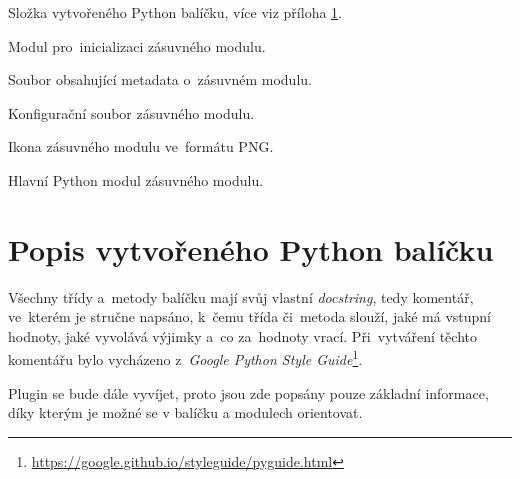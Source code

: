 \begin{description}
\begin{description}[leftmargin=1cm]
\begin{description}[leftmargin=1cm]
		\end{description}
	\end{description}
	\item[\texttt{pubin}:] Složka vytvořeného Python balíčku, více viz příloha \ref{popis_python_balicku}.
	\item[\texttt{\detokenize{__init__.py}}:] Modul pro~inicializaci zásuvného modulu.
	\item[\texttt{metadata.txt}:] Soubor obsahující metadata o~zásuvném modulu.
	\item[\texttt{puplugin.cfg}:] Konfigurační soubor zásuvného modulu.
	\item[\texttt{puplugin.png}:] Ikona zásuvného modulu ve~formátu PNG.
	\item[\texttt{puplugin.py}:] Hlavní Python modul zásuvného modulu.
\end{description}

\chapter{Popis vytvořeného Python balíčku}
\label{popis_python_balicku}

Všechny třídy a~metody balíčku mají svůj vlastní \textit{docstring}, tedy komentář, ve~kterém je stručne napsáno, k~čemu třída či~metoda slouží, jaké má vstupní hodnoty, jaké vyvolává výjimky a~co za~hodnoty vrací. Při~vytváření těchto komentářu bylo vycházeno z~\textit{Google Python Style Guide}\footnote{\url{https://google.github.io/styleguide/pyguide.html}}.

Plugin se bude dále vyvíjet, proto jsou zde popsány pouze základní informace, díky kterým je možné se v balíčku a modulech orientovat.

\bigskip

\begin{minipage}{0.9\textwidth}
\end{minipage}

